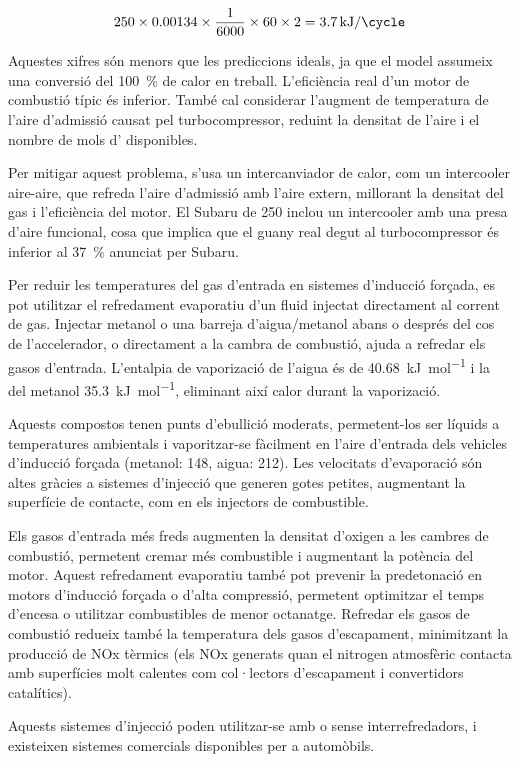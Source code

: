 \begin{equation}
    250 \times 0.00134 \times \frac{1}{6000} \times 60 \times 2 = \qty{3.7}{\kilo\joule\per\cycle}
\end{equation}

Aquestes xifres són menors que les prediccions ideals, ja que el model assumeix una conversió del \qty{100}{\percent} de calor en treball. L'eficiència real d'un motor de combustió típic és inferior. També cal considerar l'augment de temperatura de l'aire d'admissió causat pel turbocompressor, reduint la densitat de l'aire i el nombre de mols d' disponibles.

Per mitigar aquest problema, s'usa un intercanviador de calor, com un intercooler aire-aire, que refreda l'aire d'admissió amb l'aire extern, millorant la densitat del gas i l'eficiència del motor. El Subaru de \qty{250}{\hp} inclou un intercooler amb una presa d'aire funcional, cosa que implica que el guany real degut al turbocompressor és inferior al \qty{37}{\percent} anunciat per Subaru.

\begin{mybox}[title=Sistemes d'injecció metanol/aigua]
    Per reduir les temperatures del gas d'entrada en sistemes d'inducció forçada, es pot utilitzar el refredament evaporatiu d'un fluid injectat directament al corrent de gas. Injectar metanol o una barreja d'aigua/metanol abans o després del cos de l'accelerador, o directament a la cambra de combustió, ajuda a refredar els gasos d'entrada. L'entalpia de vaporizació de l'aigua és de \qty{40.68}{\kilo\joule\per\mole} i la del metanol \qty{35.3}{\kilo\joule\per\mole}, eliminant així calor durant la vaporizació. 

Aquests compostos tenen punts d'ebullició moderats, permetent-los ser líquids a temperatures ambientals i vaporitzar-se fàcilment en l'aire d'entrada dels vehicles d'inducció forçada (metanol: \qty{148}{\degreeFahrenheit}, aigua: \qty{212}{\degreeFahrenheit}). Les velocitats d'evaporació són altes gràcies a sistemes d'injecció que generen gotes petites, augmentant la superfície de contacte, com en els injectors de combustible.

Els gasos d'entrada més freds augmenten la densitat d'oxigen a les cambres de combustió, permetent cremar més combustible i augmentant la potència del motor. Aquest refredament evaporatiu també pot prevenir la predetonació en motors d'inducció forçada o d'alta compressió, permetent optimitzar el temps d'encesa o utilitzar combustibles de menor octanatge. Refredar els gasos de combustió redueix també la temperatura dels gasos d'escapament, minimitzant la producció de NOx tèrmics (els NOx generats quan el nitrogen atmosfèric contacta amb superfícies molt calentes com col·lectors d'escapament i convertidors catalítics). 

Aquests sistemes d'injecció poden utilitzar-se amb o sense interrefredadors, i existeixen sistemes comercials disponibles per a automòbils\cite{bowers_understanding_2014}.
\end{mybox}

